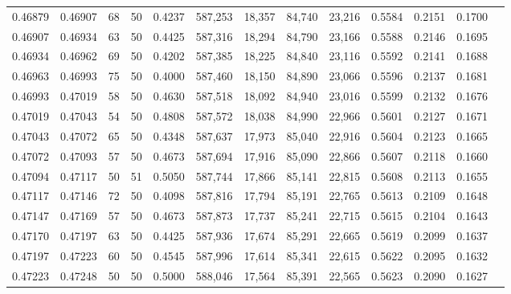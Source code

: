 \begin{tabular}{rrrrrrrrrrrrr}
0.46879 & 0.46907 &    68 &  50 &                                     0.4237 & 587,253 &  18,357 &  84,740 &  23,216 & 0.5584 & 0.2151 & 0.1700 \\
0.46907 & 0.46934 &    63 &  50 &                                     0.4425 & 587,316 &  18,294 &  84,790 &  23,166 & 0.5588 & 0.2146 & 0.1695 \\
0.46934 & 0.46962 &    69 &  50 &                                     0.4202 & 587,385 &  18,225 &  84,840 &  23,116 & 0.5592 & 0.2141 & 0.1688 \\
0.46963 & 0.46993 &    75 &  50 &                                     0.4000 & 587,460 &  18,150 &  84,890 &  23,066 & 0.5596 & 0.2137 & 0.1681 \\
0.46993 & 0.47019 &    58 &  50 &                                     0.4630 & 587,518 &  18,092 &  84,940 &  23,016 & 0.5599 & 0.2132 & 0.1676 \\
0.47019 & 0.47043 &    54 &  50 &                                     0.4808 & 587,572 &  18,038 &  84,990 &  22,966 & 0.5601 & 0.2127 & 0.1671 \\
0.47043 & 0.47072 &    65 &  50 &                                     0.4348 & 587,637 &  17,973 &  85,040 &  22,916 & 0.5604 & 0.2123 & 0.1665 \\
0.47072 & 0.47093 &    57 &  50 &                                     0.4673 & 587,694 &  17,916 &  85,090 &  22,866 & 0.5607 & 0.2118 & 0.1660 \\
0.47094 & 0.47117 &    50 &  51 &                                     0.5050 & 587,744 &  17,866 &  85,141 &  22,815 & 0.5608 & 0.2113 & 0.1655 \\
0.47117 & 0.47146 &    72 &  50 &                                     0.4098 & 587,816 &  17,794 &  85,191 &  22,765 & 0.5613 & 0.2109 & 0.1648 \\
0.47147 & 0.47169 &    57 &  50 &                                     0.4673 & 587,873 &  17,737 &  85,241 &  22,715 & 0.5615 & 0.2104 & 0.1643 \\
0.47170 & 0.47197 &    63 &  50 &                                     0.4425 & 587,936 &  17,674 &  85,291 &  22,665 & 0.5619 & 0.2099 & 0.1637 \\
0.47197 & 0.47223 &    60 &  50 &                                     0.4545 & 587,996 &  17,614 &  85,341 &  22,615 & 0.5622 & 0.2095 & 0.1632 \\
0.47223 & 0.47248 &    50 &  50 &                                     0.5000 & 588,046 &  17,564 &  85,391 &  22,565 & 0.5623 & 0.2090 & 0.1627 \\

\end{tabular}
